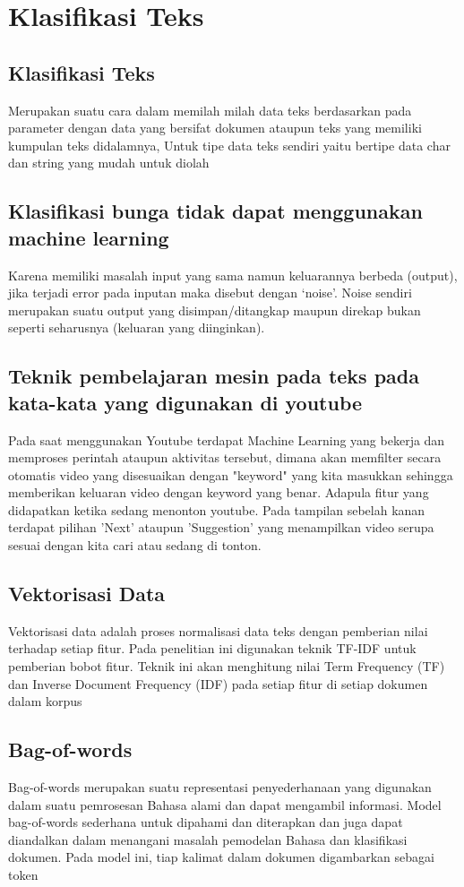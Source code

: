 \chapter{Klasifikasi Teks}

\section{Klasifikasi Teks}
Merupakan suatu cara dalam memilah milah data teks berdasarkan pada parameter dengan data yang bersifat dokumen ataupun teks yang memiliki kumpulan teks didalamnya, Untuk tipe data teks sendiri yaitu bertipe data char dan string yang mudah untuk diolah

\section{Klasifikasi bunga tidak dapat menggunakan machine learning}
Karena memiliki masalah input yang sama namun keluarannya berbeda (output), jika terjadi error pada inputan maka disebut dengan ‘noise’. Noise sendiri merupakan suatu output yang disimpan/ditangkap maupun direkap bukan seperti seharusnya (keluaran yang diinginkan).

\section{Teknik pembelajaran mesin pada teks pada kata-kata yang digunakan di youtube }
Pada saat menggunakan Youtube terdapat Machine Learning yang bekerja dan memproses perintah
ataupun aktivitas tersebut, dimana akan memfilter secara otomatis video yang disesuaikan
dengan "keyword" yang kita masukkan sehingga memberikan keluaran video dengan keyword yang benar. Adapula fitur yang didapatkan ketika sedang menonton youtube. Pada tampilan sebelah kanan terdapat pilihan 'Next' ataupun 'Suggestion' yang menampilkan video serupa sesuai dengan kita cari atau sedang di tonton.

\section{Vektorisasi Data}
Vektorisasi data adalah proses normalisasi data teks dengan pemberian nilai terhadap setiap fitur. Pada penelitian ini digunakan teknik TF-IDF untuk pemberian bobot fitur. Teknik ini akan menghitung nilai Term Frequency (TF) dan Inverse Document Frequency (IDF) pada setiap fitur di setiap dokumen dalam korpus

\section{Bag-of-words}
Bag-of-words merupakan suatu representasi penyederhanaan yang digunakan dalam suatu pemrosesan Bahasa alami dan dapat mengambil informasi. Model bag-of-words sederhana untuk dipahami dan diterapkan dan juga dapat diandalkan dalam menangani masalah pemodelan Bahasa dan klasifikasi dokumen. Pada model ini, tiap kalimat dalam dokumen digambarkan sebagai token


